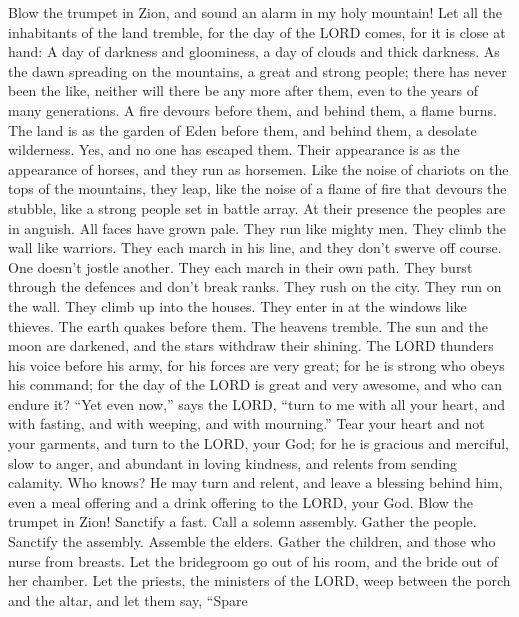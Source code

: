 Blow the trumpet in Zion, and sound an alarm in my holy
mountain! Let all the inhabitants of the land tremble, for the day of
the LORD comes, for it is close at hand:  A day of
darkness and gloominess, a day of clouds and thick darkness. As the dawn
spreading on the mountains, a great and strong people; there has never
been the like, neither will there be any more after them, even to the
years of many generations.  A fire devours before them,
and behind them, a flame burns. The land is as the garden of Eden before
them, and behind them, a desolate wilderness. Yes, and no one has
escaped them.  Their appearance is as the appearance of
horses, and they run as horsemen.  Like the noise of
chariots on the tops of the mountains, they leap, like the noise of a
flame of fire that devours the stubble, like a strong people set in
battle array.  At their presence the peoples are in
anguish. All faces have grown pale.  They run like mighty
men. They climb the wall like warriors. They each march in his line, and
they don't swerve off course.  One doesn't jostle another.
They each march in their own path. They burst through the defences and
don't break ranks.  They rush on the city. They run on the
wall. They climb up into the houses. They enter in at the windows like
thieves.  The earth quakes before them. The heavens
tremble. The sun and the moon are darkened, and the stars withdraw their
shining.  The LORD thunders his voice before his army,
for his forces are very great; for he is strong who obeys his command;
for the day of the LORD is great and very awesome, and who can endure
it?  ``Yet even now,'' says the LORD, ``turn to me with
all your heart, and with fasting, and with weeping, and with mourning.''
 Tear your heart and not your garments, and turn to the
LORD, your God; for he is gracious and merciful, slow to anger, and
abundant in loving kindness, and relents from sending calamity.
 Who knows? He may turn and relent, and leave a blessing
behind him, even a meal offering and a drink offering to the LORD, your
God.  Blow the trumpet in Zion! Sanctify a fast. Call a
solemn assembly.  Gather the people. Sanctify the
assembly. Assemble the elders. Gather the children, and those who nurse
from breasts. Let the bridegroom go out of his room, and the bride out
of her chamber.  Let the priests, the ministers of the
LORD, weep between the porch and the altar, and let them say, ``Spare

